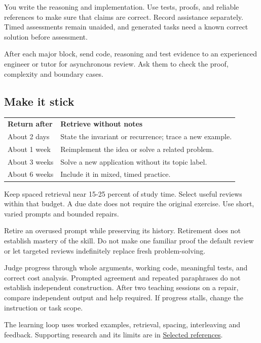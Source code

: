 \documentclass[11pt,letterpaper]{article}
\begin{document}
You write the reasoning and implementation. Use tests, proofs, and reliable references to make sure that claims are correct. Record assistance separately. Timed assessments remain unaided, and generated tasks need a known correct solution before assessment.

After each major block, send code, reasoning and test evidence to an experienced engineer or tutor for asynchronous review. Ask them to check the proof, complexity and boundary cases.

\subsection*{Make it stick}

\begin{center}
\small
\begin{tabular}{>{\raggedright\arraybackslash}p{}>{\raggedright\arraybackslash}p{}}
\textbf{Return after} & \textbf{Retrieve without notes} \\
About 2 days & State the invariant or recurrence; trace a new example. \\
About 1 week & Reimplement the idea or solve a related problem. \\
About 3 weeks & Solve a new application without its topic label. \\
About 6 weeks & Include it in mixed, timed practice. \\
\end{tabular}
\end{center}

Keep spaced retrieval near 15-25 percent of study time. Select useful reviews within that budget. A due date does not require the original exercise. Use short, varied prompts and bounded repairs.

Retire an overused prompt while preserving its history. Retirement does not establish mastery of the skill. Do not make one familiar proof the default review or let targeted reviews indefinitely replace fresh problem-solving.

Judge progress through whole arguments, working code, meaningful tests, and correct cost analysis. Prompted agreement and repeated paraphrases do not establish independent construction. After two teaching sessions on a repair, compare independent output and help required. If progress stalls, change the instruction or task scope.

The learning loop uses worked examples, retrieval, spacing, interleaving and feedback. Supporting research and its limits are in \hyperref[sec:27]{Selected references}.
\end{document}
